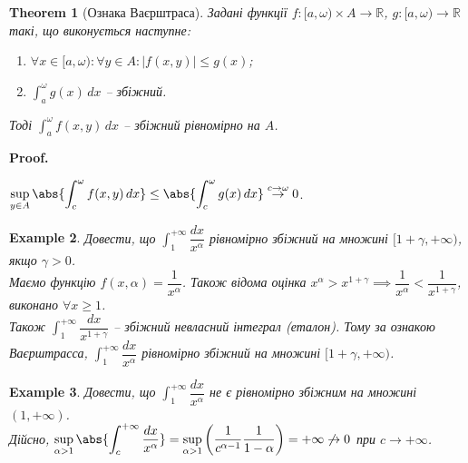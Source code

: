 \documentclass[a4paper, 10pt]{article}
\makeatletter
\def\huge{\displaystyle}
\def\qed{$\blacksquare$}
\theoremstyle{theoremdd}
\newtheorem{theorem}{Theorem}[subsection]
\theoremstyle{theoremdd}
\theoremstyle{theoremdd}
\theoremstyle{theoremdd}
\theoremstyle{theoremdd}
\newtheorem{example}[theorem]{Example}
\theoremstyle{theoremdd}
\theoremstyle{theoremdd}
\theoremstyle{theoremdd}
\theoremstyle{theoremdd}
\renewenvironment{proof}[1][Proof.\\]{\par
\pushQED{\hfill \qed}%
\normalfont \topsep6\p@\@plus6\p@\relax
\trivlist
\item\relax
{\bfseries
#1\@addpunct{.}}\hspace\labelsep\ignorespaces
}{%
\popQED\endtrivlist\@endpefalse
}
\makeatother
\begin{document}
\begin{theorem}[Ознака Ваєрштраса]
Задані функції $f \colon [a,\omega) \times A \to \mathbb{R}$, $g \colon [a,\omega) \to \mathbb{R}$ такі, що виконується наступне:
\begin{enumerate}[nosep,wide=0pt,label={\arabic*)}]
\item $\forall x \in [a,\omega): \forall y \in A: |f(x,y)| \leq g(x)$;
\item $\huge \int_a^\omega g(x)\,dx$ -- збіжний.
\end{enumerate}
Тоді $\huge \int_a^\omega f(x,y)\,dx$ -- збіжний рівномірно на $A$.
\end{theorem}

\begin{proof}
$\huge \sup_{y \in A} \abs{\int_c^\omega f(x,y)\,dx} \leq \abs{\int_c^\omega g(x)\,dx} \overset{c \to \omega}{\to} 0$.
\end{proof}

\begin{example}
Довести, що $\huge\int_1^{+\infty} \dfrac{dx}{x^\alpha}$ рівномірно збіжний на множині $[1+\gamma,+\infty)$, якщо $\gamma > 0$.\\
Маємо функцію $f(x,\alpha) = \dfrac{1}{x^\alpha}$. Також відома оцінка $x^\alpha > x^{1+\gamma} \implies \dfrac{1}{x^\alpha} < \dfrac{1}{x^{1+\gamma}}$, виконано $\forall x \geq 1$.\\
Також $\huge\int_1^{+\infty} \dfrac{dx}{x^{1+\gamma}}$ -- збіжний невласний інтеграл (еталон). Тому за ознакою Ваєрштрасса, $\huge\int_1^{+\infty} \dfrac{dx}{x^\alpha}$ рівномірно збіжний на множині $[1+\gamma,+\infty)$.
\end{example}

\begin{example}
Довести, що $\huge\int_1^{+\infty} \dfrac{dx}{x^\alpha}$ не є рівномірно збіжним на множині $(1,+\infty)$.\\
Дійсно, $\huge\sup_{\alpha > 1} \abs{\int_c^{+\infty} \dfrac{dx}{x^\alpha}} = \sup_{\alpha >1} \left(\dfrac{1}{c^{\alpha-1}} \dfrac{1}{1-\alpha}\right) = +\infty \not\to 0$ при $c \to +\infty$.
\end{example}
\end{document}
